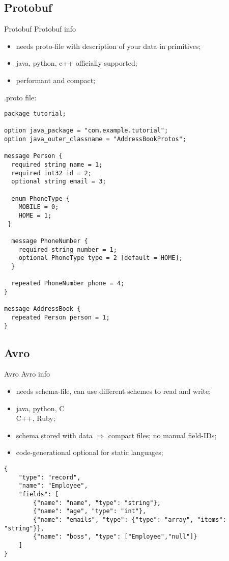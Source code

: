 \documentclass[8pt]{beamer}
\begin{document}
\renewcommand{\partname}{Protobuf}
\subsection{\partname}
\begin{frame}[fragile]{\partname}
  Protobuf info
  \begin{itemize}
    \item needs proto-file with description of your data in primitives;
    \item java, python, c++ officially supported;
    \item performant and compact;
  \end{itemize}


.proto file:
\begin{verbatim}
package tutorial;

option java_package = "com.example.tutorial";
option java_outer_classname = "AddressBookProtos";

message Person {
  required string name = 1;
  required int32 id = 2;
  optional string email = 3;

  enum PhoneType {
    MOBILE = 0;
    HOME = 1;
 }

  message PhoneNumber {
    required string number = 1;
    optional PhoneType type = 2 [default = HOME];
  }

  repeated PhoneNumber phone = 4;
}

message AddressBook {
  repeated Person person = 1;
}

\end{verbatim}

\end{frame}

\renewcommand{\partname}{Avro}
\subsection{\partname}
\begin{frame}[fragile]{\partname}
  Avro info
  \begin{itemize}
    \item needs schema-file, can use different schemes to read and write;
    \item java, python, C\\C++, Ruby;
    \item schema stored with data $\Rightarrow$ compact files; no manual
    field-IDs;
    \item code-generational optional for static languages;
  \end{itemize}

  \begin{verbatim}
{
    "type": "record",
    "name": "Employee",
    "fields": [
        {"name": "name", "type": "string"},
        {"name": "age", "type": "int"},
        {"name": "emails", "type": {"type": "array", "items": "string"}},
        {"name": "boss", "type": ["Employee","null"]}
    ]
}
  \end{verbatim}

\end{frame}
\end{document}
